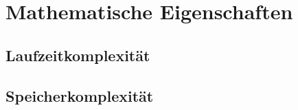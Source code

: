 \section{Mathematische Eigenschaften}

\subsection{Laufzeitkomplexität}

\subsection{Speicherkomplexität}

